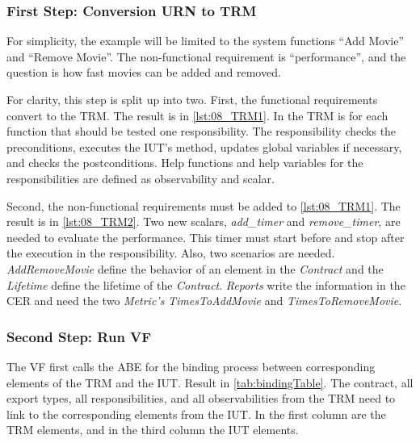 \subsubsection{First Step: Conversion URN to TRM}
For simplicity, the example will be limited to the system functions \enquote{Add Movie} and \enquote{Remove Movie}. The non-functional requirement is \enquote{performance}, and the question is how fast movies can be added and removed.

For clarity, this step is split up into two. First, the functional requirements convert to the TRM. The result is in \autoref{lst:08_TRM1}. In the TRM is for each function that should be tested one responsibility. The responsibility checks the preconditions, executes the IUT's method, updates global variables if necessary, and checks the postconditions. Help functions and help variables for the responsibilities are defined as observability and scalar. 



Second, the non-functional requirements must be added to \autoref{lst:08_TRM1}. The result is in \autoref{lst:08_TRM2}. Two new scalars, \textit{add\_timer} and \textit{remove\_timer}, are needed to evaluate the performance. This timer must start before and stop after the execution in the responsibility. Also, two scenarios are needed. \textit{AddRemoveMovie} define the behavior of an element in the \textit{Contract} and the \textit{Lifetime} define the lifetime of the \textit{Contract}. \textit{Reports} write the information in the CER and need the two \textit{Metric's} \textit{TimesToAddMovie} and \textit{TimesToRemoveMovie}.



\subsubsection{Second Step: Run VF}

The VF first calls the ABE for the binding process between corresponding elements of the TRM and the IUT. Result in \autoref{tab:bindingTable}. The contract, all export types, all responsibilities, and all observabilities from the TRM need to link to the corresponding elements from the IUT. In the first column are the TRM elements, and in the third column the IUT elements.

